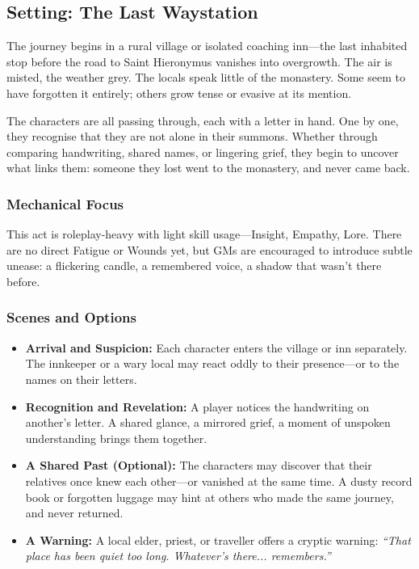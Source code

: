 \documentclass[nodeprecatedcode,bg=print]{dndbook/dndbook}
\begin{document}
\vspace{0.5\baselineskip}

\subsection*{Setting: The Last Waystation}

The journey begins in a rural village or isolated coaching inn—the last inhabited stop before the road to Saint Hieronymus vanishes into overgrowth. The air is misted, the weather grey. The locals speak little of the monastery. Some seem to have forgotten it entirely; others grow tense or evasive at its mention.

The characters are all passing through, each with a letter in hand. One by one, they recognise that they are not alone in their summons. Whether through comparing handwriting, shared names, or lingering grief, they begin to uncover what links them: someone they lost went to the monastery, and never came back.

\subsubsection{Mechanical Focus} This act is roleplay-heavy with light skill usage—Insight, Empathy, Lore. There are no direct Fatigue or Wounds yet, but GMs are encouraged to introduce subtle unease: a flickering candle, a remembered voice, a shadow that wasn’t there before.


\subsubsection{Scenes and Options}
\begin{itemize}
    \item \textbf{Arrival and Suspicion:} Each character enters the village or inn separately. The innkeeper or a wary local may react oddly to their presence—or to the names on their letters.
    
    \item \textbf{Recognition and Revelation:} A player notices the handwriting on another’s letter. A shared glance, a mirrored grief, a moment of unspoken understanding brings them together.
    
    \item \textbf{A Shared Past (Optional):} The characters may discover that their relatives once knew each other—or vanished at the same time. A dusty record book or forgotten luggage may hint at others who made the same journey, and never returned.
    
    \item \textbf{A Warning:} A local elder, priest, or traveller offers a cryptic warning: \emph{“That place has been quiet too long. Whatever’s there... remembers.”}
\end{itemize}
\end{document}

